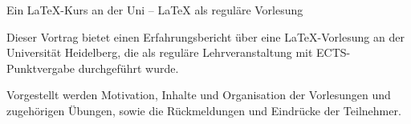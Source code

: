 Ein LaTeX-Kurs an der Uni – LaTeX als reguläre Vorlesung

Dieser Vortrag bietet einen Erfahrungsbericht über eine LaTeX-Vorlesung an der Universität Heidelberg, die als reguläre Lehrveranstaltung mit ECTS-Punktvergabe durchgeführt wurde.

Vorgestellt werden Motivation, Inhalte und Organisation der Vorlesungen und zugehörigen Übungen, sowie die Rückmeldungen und Eindrücke der Teilnehmer.